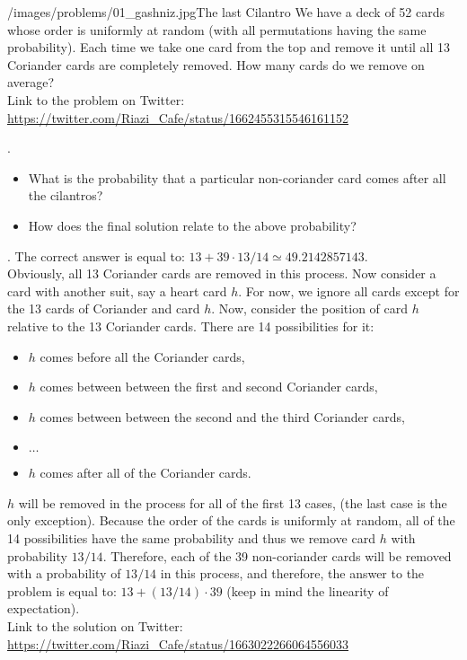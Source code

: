 \begin{problem}{/images/problems/01_gashniz.jpg}{The last Cilantro}
    We have a deck of 52 cards whose order is uniformly at random (with all permutations having the same probability).
    Each time we take one card from the top and remove it until all 13 Coriander cards are completely removed. How many cards do we remove on average?\\[0.2cm]
    
    Link to the problem on Twitter:  \url{https://twitter.com/Riazi_Cafe/status/1662455315546161152}
\end{problem}

\begin{hint}.
    \begin{itemize}
    \item What is the probability that a particular non-coriander card comes after all the cilantros?
    \item How does the final solution relate to the above probability?
    \end{itemize}    
\end{hint}
    
\begin{solution}.
    The correct answer is equal to: $13 + 39 \cdot 13/14 \simeq 49.2142857143$.\\[0.3cm]
    
    \noindent Obviously, all 13 Coriander cards are removed in this process. Now consider a card with another suit, say a heart card $h$. For now, we ignore all cards except for the 13 cards of Coriander and card $h$. Now, consider the position of card $h$ relative to the 13 Coriander cards. There are 14 possibilities for it:
    
    \begin{itemize}
    \item $h$ comes before all the Coriander cards,
    \item $h$ comes between  between the first and second Coriander cards,
    \item $h$ comes between  between the second and the third Coriander cards,
    \item $\ldots$
    \item $h$ comes after all of the Coriander cards.
    \end{itemize}
    
    $h$ will be removed in the process for all of the first 13 cases, (the last case is the only exception). Because the order of the cards is uniformly at random, all of the 14 possibilities have the same probability and thus  we remove card $h$ with probability $13/14$. Therefore, each of the 39 non-coriander cards will be removed with a probability of $13/14$ in this process, and therefore, the answer to the problem is equal to:
    $13 + (13/14) \cdot 39$ (keep in mind the linearity of expectation).\\[0.2cm]
    
    Link to the solution on Twitter:  \url{https://twitter.com/Riazi_Cafe/status/1663022266064556033}
\end{solution}

